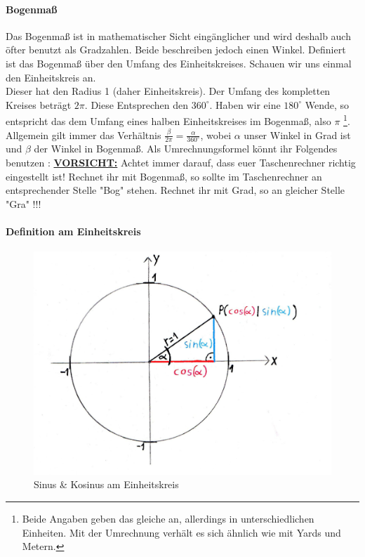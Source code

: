 		\paragraph{Bogenmaß}
			Das Bogenmaß ist in mathematischer Sicht eingänglicher und wird deshalb auch
			öfter benutzt als Gradzahlen. Beide beschreiben jedoch einen Winkel.
			Definiert ist das Bogenmaß über den Umfang des Einheitskreises. Schauen wir
			uns einmal den Einheitskreis an.\\
			Dieser hat den Radius 1 (daher Einheitskreis). Der Umfang des kompletten
			Kreises beträgt \(2\pi\). Diese Entsprechen den \(360^\circ\). Haben wir eine
			\(180^\circ\) Wende, so entspricht das dem Umfang eines halben
			Einheitskreises im Bogenmaß, also \(\pi\) \footnote{Beide Angaben geben das
			gleiche an, allerdings in unterschiedlichen Einheiten. Mit der Umrechnung
			verhält es sich ähnlich wie mit Yards und Metern.}. Allgemein gilt immer das
			Verhältnis \(\frac{\beta}{2\pi}=\frac{\alpha}{360^\circ}\), wobei \(\alpha\)
			unser Winkel in Grad ist und \(\beta\) der Winkel in Bogenmaß. Als
			Umrechnungsformel könnt ihr Folgendes benutzen :
			\formel{\[\beta=\frac{\pi \cdot \alpha}{180^\circ}\]}
			\underline{\textbf{VORSICHT:}} Achtet immer darauf, dass euer Taschenrechner
			richtig eingestellt ist! Rechnet ihr mit Bogenmaß, so sollte im
			Taschenrechner an entsprechender Stelle "Bog" stehen. Rechnet ihr mit Grad,
			so an gleicher Stelle "Gra" !!!
		\paragraph{Definition am Einheitskreis}
	   
			\begin{figure}[h]
				\centering
				\includegraphics[scale=0.2]{Images/Einheitskreis.jpeg}
				\caption{Sinus \& Kosinus am Einheitskreis}
			\end{figure}
  

